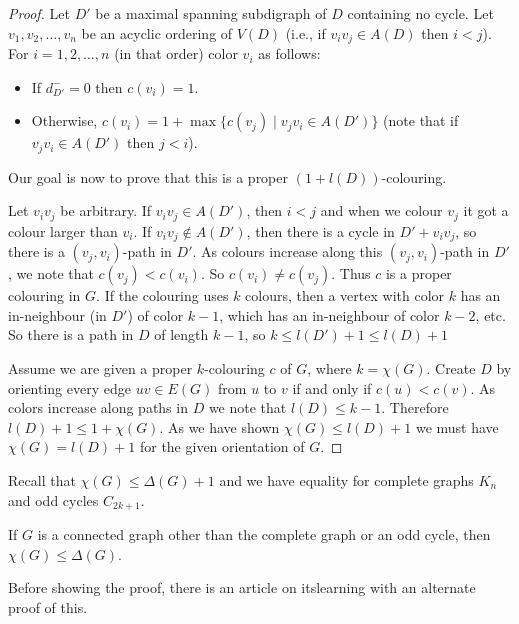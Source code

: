 \begin{proof}
	Let $D'$ be a maximal spanning subdigraph of $D$ containing no cycle. Let $v_{1}, v_{2}, \ldots, v_{n}$ be an acyclic ordering of $V(D)$ (i.e., if $v_{i}v_{j} \in A(D)$ then $i < j$). For $i = 1, 2, \ldots, n$ (in that order) color $v_{i}$ as follows:
	\begin{itemize}
		\item If $d^{-}_{D'} = 0$ then $c(v_{i}) = 1$.
		\item Otherwise, $c(v_{i})=1+ \max\{c(v_{j}) \mid v_{j}v_{i} \in A(D')\}$ (note that if $v_{j}v_{i} \in A(D')$ then $j<i$).
	\end{itemize}

	Our goal is now to prove that this is a proper $(1+l(D))$-colouring.

	Let $v_{i}v_{j}$ be arbitrary. If $v_{i}v_{j} \in A(D')$, then $i < j$ and when we colour $v_{j}$ it got a colour larger than $v_{i}$. If $v_{i}v_{j} \notin A(D')$, then there is a cycle in $D' + v_{i}v_{j}$, so there is a $(v_{j},v_{i})$-path in $D'$. As colours increase along this $(v_{j},v_{i})$-path in $D'$, we note that $c(v_{j}) < c(v_{i})$. So $c(v_{i}) \ne c(v_{j})$. Thus $c$ is a proper colouring in $G$. If the colouring uses $k$ colours, then a vertex with color $k$ has an in-neighbour (in $D'$) of color $k-1$, which has an in-neighbour of color $k-2$, etc. So there is a path  in $D$ of length $k-1$, so $k \le l(D') + 1 \le l(D)+1$

	Assume we are given a proper $k$-colouring $c$ of $G$, where $k = \chi(G)$. Create $D$ by orienting every edge $uv \in E(G)$ from $u$ to $v$ if and only if $c(u)  < c(v)$. As colors increase along paths in $D$ we note that $l(D) \le k-1$. Therefore $l(D) + 1 \le 1 + \chi(G)$. As we have shown $\chi(G) \le l(D)+1$ we must have $\chi(G) = l(D) +1$ for the given orientation of $G$.
\end{proof}

Recall that $\chi(G) \le \Delta(G)+1$ and we have equality for complete graphs $K_{n}$ and odd cycles $C_{2k+1}$.

\begin{theorem}
	If $G$ is a connected graph other than the complete graph or an odd cycle, then $\chi(G) \le \Delta(G)$.
\end{theorem}

Before showing the proof, there is an article on itslearning with an alternate proof of this.

